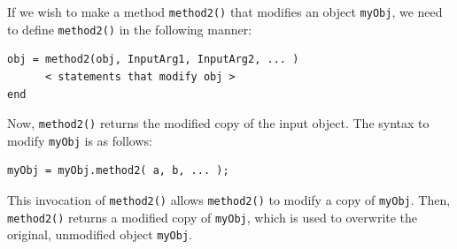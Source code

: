 If we wish to make a method \texttt{method2()} that modifies an object \texttt{myObj}, we need to define \texttt{method2()} in the following manner:
\begin{lstlisting}[style=Matlab-editor]
obj = method2(obj, InputArg1, InputArg2, ... )
      < statements that modify obj >
end
\end{lstlisting}
Now, \texttt{method2()} returns the modified copy of the input object. The syntax to modify \texttt{myObj} is as follows:
\begin{lstlisting}[style=Matlab-editor]
myObj = myObj.method2( a, b, ... );
\end{lstlisting}
This invocation of \texttt{method2()} allows \texttt{method2()} to modify a copy of \texttt{myObj}. Then, \texttt{method2()} returns a modified copy of \texttt{myObj}, which is used to overwrite the original, unmodified object \texttt{myObj}.

